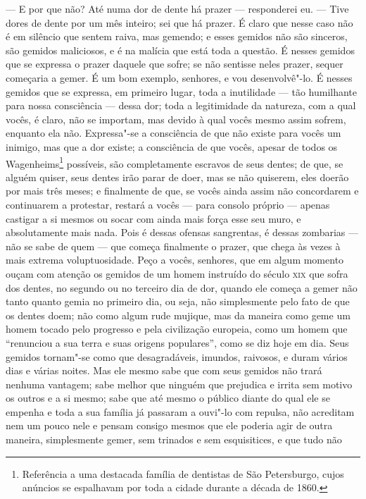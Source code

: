 --- E por que não? Até numa dor de dente há prazer --- responderei eu. ---
Tive dores de dente por um mês inteiro; sei que há prazer. É claro que
nesse caso não é em silêncio que sentem raiva, mas gemendo; e esses
gemidos não são sinceros, são gemidos maliciosos, e é na malícia que
está toda a questão. É nesses gemidos que se expressa o prazer daquele
que sofre; se não sentisse neles prazer, sequer começaria a gemer. É um
bom exemplo, senhores, e vou desenvolvê"-lo. É nesses gemidos que se
expressa, em primeiro lugar, toda a inutilidade --- tão humilhante para
nossa consciência --- dessa dor; toda a legitimidade da natureza, com a
qual vocês, é claro, não se importam, mas devido à qual vocês mesmo
assim sofrem, enquanto ela não. Expressa"-se a consciência de que não
existe para vocês um inimigo, mas que a dor existe; a consciência de
que vocês, apesar de todos os Wagenheims\footnote{ Referência a uma destacada 
família de dentistas de São Petersburgo,
cujos anúncios se espalhavam por toda a cidade durante a década de
1860.} possíveis, são completamente escravos de seus dentes; de que, se alguém
quiser, seus dentes irão parar de doer, mas se não quiserem, eles
doerão por mais três meses; e finalmente de que, se vocês ainda assim
não concordarem e continuarem a protestar, restará a vocês --- para
consolo próprio --- apenas castigar a si mesmos ou socar com ainda mais
força esse seu muro, e absolutamente mais nada. Pois é dessas ofensas
sangrentas, é dessas zombarias --- não se sabe de quem --- que começa
finalmente o prazer, que chega às vezes à mais extrema voluptuosidade.
Peço a vocês, senhores, que em algum momento ouçam com atenção os
gemidos de um homem instruído do século \textsc{xix} que sofra dos dentes, no
segundo ou no terceiro dia de dor, quando ele começa a gemer não tanto
quanto gemia no primeiro dia, ou seja, não simplesmente pelo fato de
que os dentes doem; não como algum rude mujique, mas da maneira como
geme um homem tocado pelo progresso e pela civilização europeia, como
um homem que “renunciou a sua terra e suas origens populares”, como se
diz hoje em dia. Seus gemidos tornam"-se como que desagradáveis,
imundos, raivosos, e duram vários dias e várias noites. Mas ele mesmo
sabe que com seus gemidos não trará nenhuma vantagem; sabe melhor que
ninguém que prejudica e irrita sem motivo os outros e a si mesmo; sabe
que até mesmo o público diante do qual ele se empenha e toda a sua
família já passaram a ouvi"-lo com repulsa, não acreditam nem um pouco
nele e pensam consigo mesmos que ele poderia agir de outra maneira,
simplesmente gemer, sem trinados e sem esquisitices, e que tudo não
